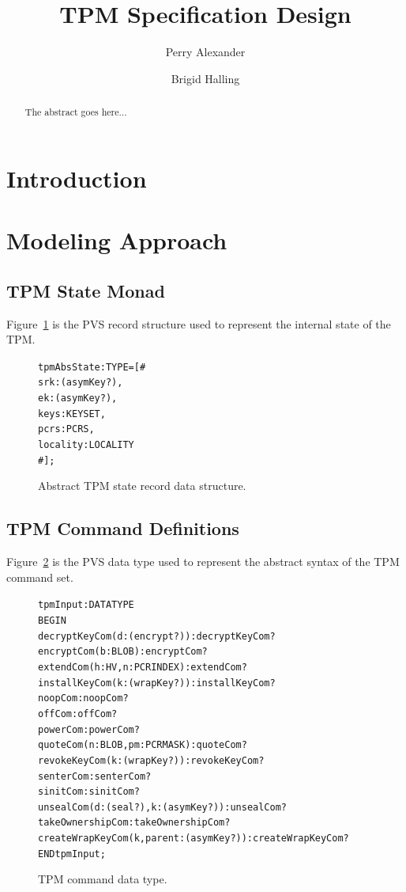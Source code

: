 \documentclass[10pt]{article}
\title{TPM Specification Design}
\author{Perry Alexander \and Brigid Halling}
\begin{document}
\maketitle
\tableofcontents
\listoffigures
\listoftables

\begin{abstract}
  The abstract goes here...
\end{abstract}

\section{Introduction}

\section{Modeling Approach}

\subsection{TPM State Monad}

Figure~\ref{fig:tpm-abs-state} is the PVS record structure used to
represent the internal state of the TPM.

\begin{figure}
\begin{alltt}
  tpmAbsState : TYPE = [#
                       srk : (asymKey?),
                       ek : (asymKey?),
                       keys : KEYSET,
                       pcrs : PCRS,
                       locality : LOCALITY
                       #];
\end{alltt}
\caption{Abstract TPM state record data structure.}
\label{fig:tpm-abs-state}
\end{figure}

\subsection{TPM Command Definitions}

Figure~\ref{fig:tpm-command} is the PVS data type used to represent
the abstract syntax of the TPM command set.

\begin{figure}
\begin{alltt}
  tpmInput : DATATYPE
  BEGIN
    decryptKeyCom(d:(encrypt?)) : decryptKeyCom?
    encryptCom(b:BLOB) : encryptCom? %
    extendCom(h:HV,n:PCRINDEX) : extendCom?
    installKeyCom(k:(wrapKey?)): installKeyCom?
    noopCom : noopCom?
    offCom : offCom?
    powerCom : powerCom?
    quoteCom(n:BLOB,pm:PCRMASK) : quoteCom? %
    revokeKeyCom(k:(wrapKey?)): revokeKeyCom?
    senterCom : senterCom? %
    sinitCom : sinitCom? %
    unsealCom(d:(seal?),k:(asymKey?)) : unsealCom?   
    takeOwnershipCom : takeOwnershipCom?
    createWrapKeyCom(k,parent:(asymKey?)): createWrapKeyCom?
  END tpmInput;
\end{alltt}
\caption{TPM command data type.}
\label{fig:tpm-command}
\end{figure}
\end{document}
